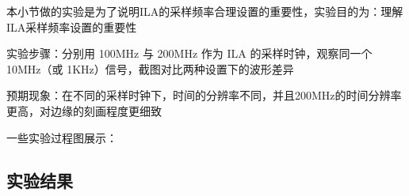 
本小节做的实验是为了说明ILA的采样频率合理设置的重要性，实验目的为：理解ILA采样频率设置的重要性




实验步骤：分别用 100MHz 与 200MHz 作为 ILA 的采样时钟，观察同一个 10MHz（或 1KHz）信号，截图对比两种设置下的波形差异

预期现象：在不同的采样时钟下，时间的分辨率不同，并且200MHz的时间分辨率更高，对边缘的刻画程度更细致

一些实验过程图展示：

\subsection{实验结果}

